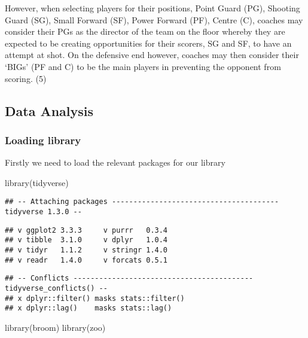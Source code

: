 \documentclass[
]{article}
\newenvironment{Shaded}{\begin{snugshade}}{\end{snugshade}}
\newcommand{\FunctionTok}[1]{\textcolor[rgb]{0.00,0.00,0.00}{#1}}
\newcommand{\NormalTok}[1]{#1}
\begin{document}
However, when selecting players for their positions, Point Guard (PG),
Shooting Guard (SG), Small Forward (SF), Power Forward (PF), Centre (C),
coaches may consider their PGs as the director of the team on the floor
whereby they are expected to be creating opportunities for their
scorers, SG and SF, to have an attempt at shot. On the defensive end
however, coaches may then consider their `BIGs' (PF and C) to be the
main players in preventing the opponent from scoring. (5)

\hypertarget{data-analysis}{%
\subsection{Data Analysis}\label{data-analysis}}

\hypertarget{loading-library}{%
\subsubsection{Loading library}\label{loading-library}}

Firstly we need to load the relevant packages for our library

\begin{Shaded}
\begin{Highlighting}[]
\FunctionTok{library}\NormalTok{(tidyverse)}
\end{Highlighting}
\end{Shaded}

\begin{verbatim}
## -- Attaching packages --------------------------------------- tidyverse 1.3.0 --
\end{verbatim}

\begin{verbatim}
## v ggplot2 3.3.3     v purrr   0.3.4
## v tibble  3.1.0     v dplyr   1.0.4
## v tidyr   1.1.2     v stringr 1.4.0
## v readr   1.4.0     v forcats 0.5.1
\end{verbatim}

\begin{verbatim}
## -- Conflicts ------------------------------------------ tidyverse_conflicts() --
## x dplyr::filter() masks stats::filter()
## x dplyr::lag()    masks stats::lag()
\end{verbatim}

\begin{Shaded}
\begin{Highlighting}[]
\FunctionTok{library}\NormalTok{(broom)}
\FunctionTok{library}\NormalTok{(zoo)}
\end{Highlighting}
\end{Shaded}
\end{document}
